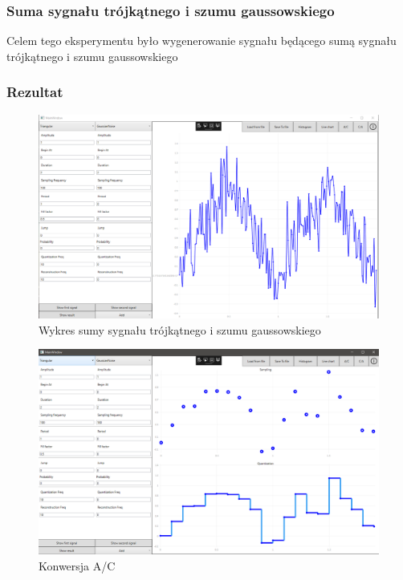 \documentclass[12pt]{article}
\begin{document}
\subsubsection{Suma sygnału trójkątnego i szumu gaussowskiego}
Celem tego eksperymentu było wygenerowanie sygnału będącego sumą sygnału trójkątnego i szumu gaussowskiego


\subsubsection{Rezultat}

\begin{figure}[H]
 \centering
 \includegraphics[width=14cm]{images/addline.PNG}
 \vspace{-0.3cm}
 \caption{Wykres sumy sygnału trójkątnego i szumu gaussowskiego}
 \label{gui}
\end{figure}

\begin{figure}[H]
 \centering
 \includegraphics[width=14cm]{images/addac.PNG}
 \vspace{-0.3cm}
 \caption{Konwersja A/C}
 \label{gui}
\end{figure}
\end{document}
